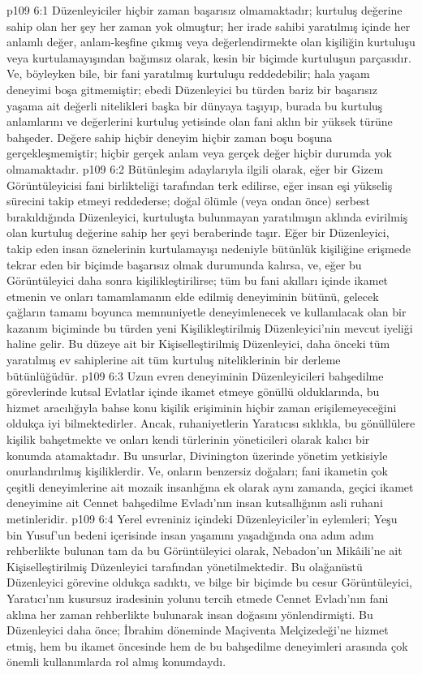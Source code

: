 \vs p109 6:1 Düzenleyiciler hiçbir zaman başarısız olmamaktadır; kurtuluş değerine sahip olan her şey her zaman yok olmuştur; her irade sahibi yaratılmış içinde her anlamlı değer, anlam\hyp{}keşfine çıkmış veya değerlendirmekte olan kişiliğin kurtuluşu veya kurtulamayışından bağımsız olarak, kesin bir biçimde kurtuluşun parçasıdır. Ve, böyleyken bile, bir fani yaratılmış kurtuluşu reddedebilir; hala yaşam deneyimi boşa gitmemiştir; ebedi Düzenleyici bu türden bariz bir başarısız yaşama ait değerli nitelikleri başka bir dünyaya taşıyıp, burada bu kurtuluş anlamlarını ve değerlerini kurtuluş yetisinde olan fani aklın bir yüksek türüne bahşeder. Değere sahip hiçbir deneyim hiçbir zaman boşu boşuna gerçekleşmemiştir; hiçbir gerçek anlam veya gerçek değer hiçbir durumda yok olmamaktadır.
\vs p109 6:2 Bütünleşim adaylarıyla ilgili olarak, eğer bir Gizem Görüntüleyicisi fani birlikteliği tarafından terk edilirse, eğer insan eşi yükseliş sürecini takip etmeyi reddederse; doğal ölümle (veya ondan önce) serbest bırakıldığında Düzenleyici, kurtuluşta bulunmayan yaratılmışın aklında evirilmiş olan kurtuluş değerine sahip her şeyi beraberinde taşır. Eğer bir Düzenleyici, takip eden insan öznelerinin kurtulamayışı nedeniyle bütünlük kişiliğine erişmede tekrar eden bir biçimde başarısız olmak durumunda kalırsa, ve, eğer bu Görüntüleyici daha sonra kişilikleştirilirse; tüm bu fani akılları içinde ikamet etmenin ve onları tamamlamanın elde edilmiş deneyiminin bütünü, gelecek çağların tamamı boyunca memnuniyetle deneyimlenecek ve kullanılacak olan bir kazanım biçiminde bu türden yeni Kişilikleştirilmiş Düzenleyici’nin mevcut iyeliği haline gelir. Bu düzeye ait bir Kişiselleştirilmiş Düzenleyici, daha önceki tüm yaratılmış ev sahiplerine ait tüm kurtuluş niteliklerinin bir derleme bütünlüğüdür.
\vs p109 6:3 Uzun evren deneyiminin Düzenleyicileri bahşedilme görevlerinde kutsal Evlatlar içinde ikamet etmeye gönüllü olduklarında, bu hizmet aracılığıyla bahse konu kişilik erişiminin hiçbir zaman erişilemeyeceğini oldukça iyi bilmektedirler. Ancak, ruhaniyetlerin Yaratıcısı sıklıkla, bu gönüllülere kişilik bahşetmekte ve onları kendi türlerinin yöneticileri olarak kalıcı bir konumda atamaktadır. Bu unsurlar, Divinington üzerinde yönetim yetkisiyle onurlandırılmış kişiliklerdir. Ve, onların benzersiz doğaları; fani ikametin çok çeşitli deneyimlerine ait mozaik insanlığına ek olarak aynı zamanda, geçici ikamet deneyimine ait Cennet bahşedilme Evladı’nın insan kutsallığının asli ruhani metinleridir.
\vs p109 6:4 Yerel evreniniz içindeki Düzenleyiciler’in eylemleri; Yeşu bin Yusuf’un bedeni içerisinde insan yaşamını yaşadığında ona adım adım rehberlikte bulunan tam da bu Görüntüleyici olarak, Nebadon’un Mikâili’ne ait Kişiselleştirilmiş Düzenleyici tarafından yönetilmektedir. Bu olağanüstü Düzenleyici görevine oldukça sadıktı, ve bilge bir biçimde bu cesur Görüntüleyici, Yaratıcı’nın kusursuz iradesinin yolunu tercih etmede Cennet Evladı’nın fani aklına her zaman rehberlikte bulunarak insan doğasını yönlendirmişti. Bu Düzenleyici daha önce; İbrahim döneminde Maçiventa Melçizedeği’ne hizmet etmiş, hem bu ikamet öncesinde hem de bu bahşedilme deneyimleri arasında çok önemli kullanımlarda rol almış konumdaydı.
